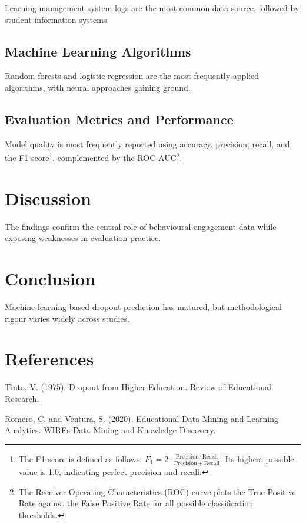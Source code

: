 \documentclass[12pt]{article}
\begin{document}
Learning management system logs are the most common data source, followed by student information systems.

\subsection{Machine Learning Algorithms}

Random forests and logistic regression are the most frequently applied algorithms, with neural approaches gaining ground.

\subsection{Evaluation Metrics and Performance}

Model quality is most frequently reported using accuracy, precision, recall, and the F1-score\footnote{The F1-score is defined as follows: \(F_1 = 2 \cdot \frac{\mathrm{Precision} \cdot \mathrm{Recall}}{\mathrm{Precision} + \mathrm{Recall}}\). Its highest possible value is 1.0, indicating perfect precision and recall.}, complemented by the ROC-AUC\footnote{The Receiver Operating Characteristics (ROC) curve plots the True Positive Rate against the False Positive Rate for all possible classification thresholds.}.

\section{Discussion}

The findings confirm the central role of behavioural engagement data while exposing weaknesses in evaluation practice.

\section{Conclusion}

Machine learning based dropout prediction has matured, but methodological rigour varies widely across studies.

\section{References}

Tinto, V. (1975). Dropout from Higher Education. Review of Educational Research.

Romero, C. and Ventura, S. (2020). Educational Data Mining and Learning Analytics. WIREs Data Mining and Knowledge Discovery.
\end{document}
